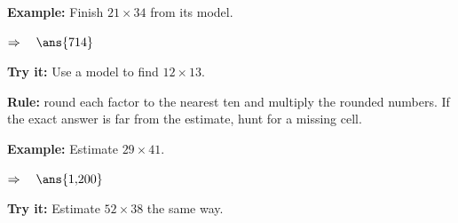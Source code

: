 \documentclass[12pt]{article}
\begin{document}
\begin{examplebox}
\textbf{Example:} \quad Finish $21 \times 34$ from its model.

$\Rightarrow\quad \ans{714}$
\end{examplebox}

\begin{tryitbox}
\textbf{Try it:} \quad Use a model to find $12 \times 13$.\\[2pt]
\end{tryitbox}


\begin{formulabox}
\textbf{Rule:} round each factor to the nearest ten and multiply the rounded
numbers. If the exact answer is far from the estimate, hunt for a missing
cell.
\end{formulabox}

\begin{examplebox}
\textbf{Example:} \quad Estimate $29 \times 41$.

$\Rightarrow\quad \ans{1{,}200}$
\end{examplebox}

\begin{tryitbox}
\textbf{Try it:} \quad Estimate $52 \times 38$ the same way.\\[2pt]
\end{tryitbox}
\end{document}
